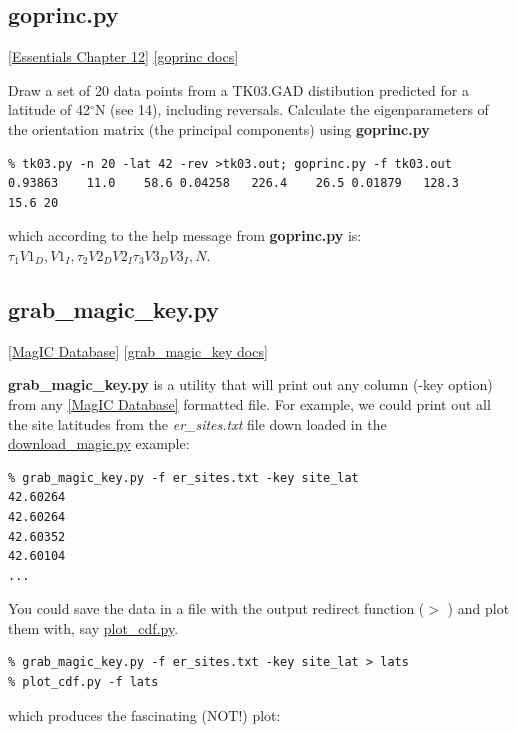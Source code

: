 \documentclass[11pt]{book}
\begin{document}
{{\subsection{goprinc.py}
 \href{http://earthref.org/MAGIC/books/Tauxe/Essentials/WebBook3ch11.html#ch11}{[Essentials Chapter 12]}
 \href{https://github.com/PmagPy/PmagPy/blob/master/programs/goprinc.py}{[goprinc docs]}

Draw a set of 20 data points  from a TK03.GAD distibution predicted for a latitude of 42$^{\circ}$N (see  14), including reversals.  Calculate the eigenparameters of the orientation matrix (the principal components)  using {\bf goprinc.py}

\begin{verbatim}
% tk03.py -n 20 -lat 42 -rev >tk03.out; goprinc.py -f tk03.out
0.93863    11.0    58.6 0.04258   226.4    26.5 0.01879   128.3    15.6 20
\end{verbatim}

\noindent  which according to the help message from {\bf goprinc.py} is:    $\tau_1 V1_D, V1_I,  \tau_2 V2_D V2_I \tau_3 V3_D V3_I, N$.

\subsection{grab\_magic\_key.py}
\href{#MagICDatabase}{[MagIC Database]}
\href{https://github.com/PmagPy/PmagPy/blob/master/programs/grab_magic_key.py}{[grab\_magic\_key docs]}

{\bf grab\_magic\_key.py} is  a utility that will print out any column (-key option) from any \href{#MagICDatabase}{[MagIC Database]} formatted file.  For example, we could print out all the site latitudes from the  {\it er\_sites.txt} file down loaded in the \href{#download_magic.py}{download\_magic.py} example:

\begin{verbatim}
% grab_magic_key.py -f er_sites.txt -key site_lat
42.60264
42.60264
42.60352
42.60104
...
\end{verbatim}

You could save the data in a file with the output redirect function ($>$ ) and plot them with, say \href{#plot_cdf.py}{plot\_cdf.py}.

\begin{verbatim}
% grab_magic_key.py -f er_sites.txt -key site_lat > lats
% plot_cdf.py -f lats
\end{verbatim}

which produces  the fascinating (NOT!) plot:

}}
\end{document}
